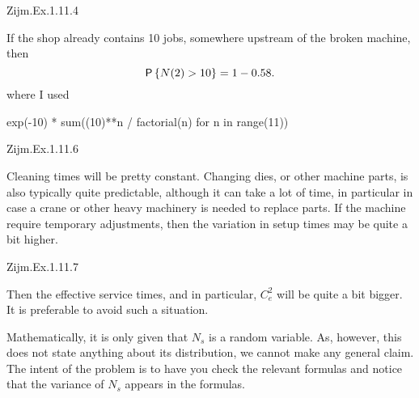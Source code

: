 \begin{exercise}
Zijm.Ex.1.11.4

 \begin{solution}
If the shop already contains 10 jobs, somewhere upstream of the broken machine, then 
   \begin{equation*}
     \P{N(2) > 10} = 1- 0.58.
   \end{equation*}
where  I used
\begin{pyconsole}
exp(-10) * sum((10)**n / factorial(n) for n in range(11))
\end{pyconsole}
\end{solution}
\end{exercise}

\begin{exercise}
Zijm.Ex.1.11.6
 \begin{solution}
   Cleaning times will be pretty constant. Changing dies, or other
   machine parts, is also typically quite predictable, although it can
   take a lot of time, in particular in case a crane or other heavy
   machinery is needed to replace parts. If the machine require
   temporary adjustments, then the variation in setup times may be
   quite a bit higher.
\end{solution}
\end{exercise}

\begin{exercise}
Zijm.Ex.1.11.7
 \begin{solution}
   Then the effective service times, and in particular, $C_e^2$ will
   be quite a bit bigger. It is preferable to avoid such a situation. 

   Mathematically, it is only given that $N_s$ is a random
   variable. As, however, this does not state anything about its
   distribution, we cannot make any general claim. The intent of the
   problem is to have you check the relevant formulas and notice that
   the variance of $N_s$ appears in the formulas.
\end{solution}
\end{exercise}

